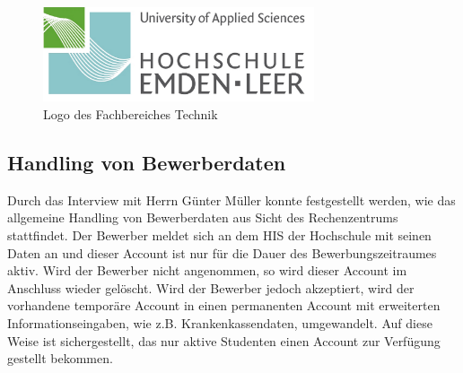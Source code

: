 \begin{figure}[h!]
	\centering
	\includegraphics[width=8cm]{kapitel/gruppe2/bilder/hs_logo_technik}
	\caption{Logo des Fachbereiches Technik}
	\label{fig_logo_fb_technik}
\end{figure}

\subsection{Handling von Bewerberdaten}
Durch das Interview mit Herrn Günter Müller konnte festgestellt werden, wie das allgemeine Handling von Bewerberdaten aus Sicht des Rechenzentrums stattfindet. 
Der Bewerber meldet sich an dem HIS der Hochschule mit seinen Daten an und dieser Account ist nur für die Dauer des Bewerbungszeitraumes aktiv. Wird der Bewerber nicht angenommen, so wird dieser Account im Anschluss wieder gelöscht. Wird der Bewerber jedoch akzeptiert, wird der vorhandene temporäre Account in einen permanenten Account mit erweiterten Informationseingaben, wie z.B. Krankenkassendaten, umgewandelt. Auf diese Weise ist sichergestellt, das nur aktive Studenten einen Account zur Verfügung gestellt bekommen.